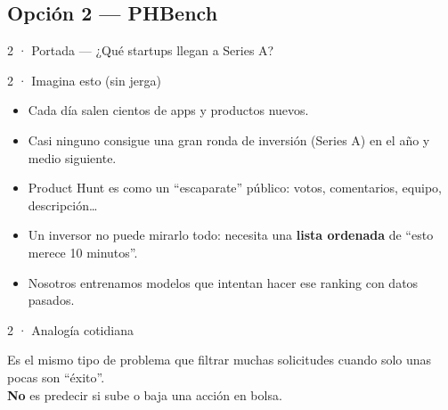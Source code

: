 \subsection{Opción 2 --- PHBench}

\begin{frame}{2 · Portada --- ¿Qué startups llegan a Series A?}
\end{frame}

\begin{frame}{2 · Imagina esto (sin jerga)}
  \begin{itemize}
    \item Cada día salen cientos de apps y productos nuevos.
    \item Casi ninguno consigue una gran ronda de inversión (Series A) en el año y medio siguiente.
    \item Product Hunt es como un ``escaparate'' público: votos, comentarios, equipo, descripción\ldots
    \item Un inversor no puede mirarlo todo: necesita una \textbf{lista ordenada} de ``esto merece 10 minutos''.
    \item Nosotros entrenamos modelos que intentan hacer ese ranking con datos pasados.
  \end{itemize}
\end{frame}

\begin{frame}{2 · Analogía cotidiana}
  \begin{center}
  \end{center}
  \vspace{0.5em}
  Es el mismo tipo de problema que filtrar muchas solicitudes cuando solo unas pocas son ``éxito''.\\
  \textbf{No} es predecir si sube o baja una acción en bolsa.
\end{frame}

